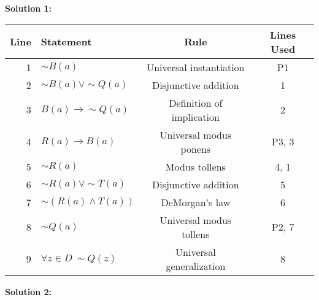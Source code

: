\documentclass[12pt, letterpaper]{report}
\newcommand{\nott}{{\sim}}
\begin{document}
\begin{enumerate}
\begin{enumerate}
        
        \textbf{Solution 1:}
        
        \begin{tabular}{|r|l|c|c|} \hline
                Line & Statement & Rule & Lines Used \\ \hline
                1 & $\nott B(a)$ & Universal instantiation & P1 \\ \hline
                2 & $\nott B(a) \lor \nott Q(a)$ & Disjunctive addition & 1 \\ \hline
                3 & $B(a) \to \nott Q(a)$ & Definition of implication & 2 \\ \hline
                4 & $R(a) \to B(a)$ & Universal modus ponens & P3, 3 \\ \hline
                5 & $\nott R(a)$ & Modus tollens & 4, 1 \\ \hline
                6 & $\nott R(a) \lor \nott T(a)$& Disjunctive addition & 5\\ \hline
                7 & $\nott (R(a) \land  T(a))$ & DeMorgan's law & 6 \\ \hline
                8 & $\nott Q(a)$& Universal modus tollens & P2, 7 \\ \hline
                9 & $\forall z \in D \ \nott Q(z)$ & Universal generalization & 8 \\ \hline
                \end{tabular}
                
        \textbf{Solution 2:}
        

\end{enumerate}
\end{enumerate}
\end{document}
